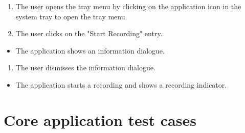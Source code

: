 \begin{tests}
    {\begin{enumerate}
        \item The \gls{user} opens the tray menu by clicking on the application icon in the system tray to open the tray menu.
        \item The \gls{user} clicks on the "Start Recording" entry.
    \end{enumerate}}
    {\begin{itemize}
        \item The application shows an information dialogue.
    \end{itemize}}
    
    {\begin{enumerate}
        \item The user dismisses the information dialogue.
    \end{enumerate}}
    {\begin{itemize}
        \item The application starts a recording and shows a recording indicator.
    \end{itemize}}
    
\end{tests}

\section{Core application test cases}

